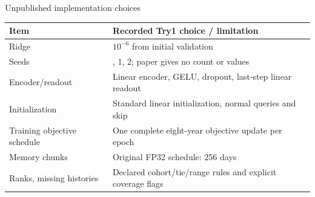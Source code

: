 \documentclass[11pt]{beamer}
\begin{document}
\begin{frame}{Unpublished implementation choices}
\small
\begin{tabular}{@{}>{\raggedright\arraybackslash}p{}>{\raggedright\arraybackslash}p{}@{}}\toprule
Item & Recorded Try1 choice / limitation\\\midrule
Ridge & $10^{-6}$ from initial validation\\[1mm]
Seeds & 0, 1, 2; paper gives no count or values\\[1mm]
Encoder/readout & Linear encoder, GELU, dropout, last-step linear readout\\[1mm]
Initialization & Standard linear initialization, normal queries and skip\\[1mm]
Training objective schedule & One complete eight-year objective update per epoch\\[1mm]
Memory chunks & Original FP32 schedule: 256 days\\[1mm]
Ranks, missing histories & Declared cohort/tie/range rules and explicit coverage flags\\\bottomrule
\end{tabular}\par
{}
\end{frame}
\end{document}
